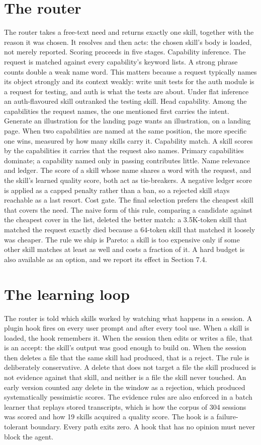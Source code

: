 \documentclass[sigconf,acmsmall]{acmart}
\begin{document}
\section{The router}
The router takes a free-text need and returns exactly one skill, together with the reason it was chosen. It resolves and then acts: the chosen skill's body is loaded, not merely reported. Scoring proceeds in five stages.
Capability inference. The request is matched against every capability's keyword lists. A strong phrase counts double a weak name word. This matters because a request typically names its object strongly and its context weakly: write unit tests for the auth module is a request for testing, and auth is what the tests are about. Under flat inference an auth-flavoured skill outranked the testing skill.
Head capability. Among the capabilities the request names, the one mentioned first carries the intent. Generate an illustration for the landing page wants an illustration, on a landing page. When two capabilities are named at the same position, the more specific one wins, measured by how many skills carry it.
Capability match. A skill scores by the capabilities it carries that the request also names. Primary capabilities dominate; a capability named only in passing contributes little.
Name relevance and ledger. The score of a skill whose name shares a word with the request, and the skill's learned quality score, both act as tie-breakers. A negative ledger score is applied as a capped penalty rather than a ban, so a rejected skill stays reachable as a last resort.
Cost gate. The final selection prefers the cheapest skill that covers the need. The naive form of this rule, comparing a candidate against the cheapest cover in the list, deleted the better match: a 3.5K-token skill that matched the request exactly died because a 64-token skill that matched it loosely was cheaper. The rule we ship is Pareto: a skill is too expensive only if some other skill matches at least as well and costs a fraction of it. A hard budget is also available as an option, and we report its effect in Section 7.4.

\section{The learning loop}
The router is told which skills worked by watching what happens in a session. A plugin hook fires on every user prompt and after every tool use. When a skill is loaded, the hook remembers it. When the session then edits or writes a file, that is an accept: the skill's output was good enough to build on. When the session then deletes a file that the same skill had produced, that is a reject.
The rule is deliberately conservative. A delete that does not target a file the skill produced is not evidence against that skill, and neither is a file the skill never touched. An early version counted any delete in the window as a rejection, which produced systematically pessimistic scores. The evidence rules are also enforced in a batch learner that replays stored transcripts, which is how the corpus of 304 sessions was scored and how 19 skills acquired a quality score.
The hook is a failure-tolerant boundary. Every path exits zero. A hook that has no opinion must never block the agent.
\end{document}
